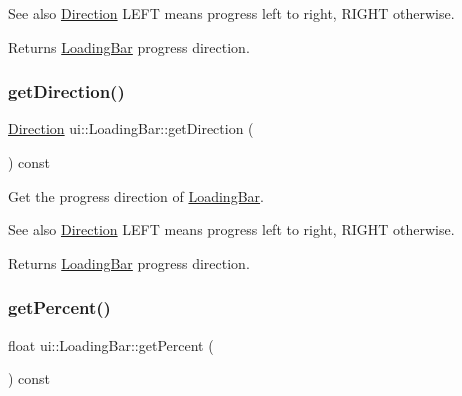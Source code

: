 \begin{DoxySeeAlso}{See also}
\hyperlink{classui_1_1LoadingBar_a4407b3ce72891a78755e25d765e25063}{Direction} {\ttfamily L\+E\+FT} means progress left to right, {\ttfamily R\+I\+G\+HT} otherwise. 
\end{DoxySeeAlso}
\begin{DoxyReturn}{Returns}
\hyperlink{classui_1_1LoadingBar}{Loading\+Bar} progress direction. 
\end{DoxyReturn}
\mbox{\label{classui_1_1LoadingBar_a18a37f835549480ff0cf0ce2fde8b8dc}} 
\subsubsection{\texorpdfstring{get\+Direction()}{getDirection()}\hspace{0.1cm}{\footnotesize\ttfamily [2/2]}}
{\footnotesize\ttfamily \hyperlink{classui_1_1LoadingBar_a4407b3ce72891a78755e25d765e25063}{Direction} ui\+::\+Loading\+Bar\+::get\+Direction (\begin{DoxyParamCaption}{ }\end{DoxyParamCaption}) const}

Get the progress direction of \hyperlink{classui_1_1LoadingBar}{Loading\+Bar}.

\begin{DoxySeeAlso}{See also}
\hyperlink{classui_1_1LoadingBar_a4407b3ce72891a78755e25d765e25063}{Direction} {\ttfamily L\+E\+FT} means progress left to right, {\ttfamily R\+I\+G\+HT} otherwise. 
\end{DoxySeeAlso}
\begin{DoxyReturn}{Returns}
\hyperlink{classui_1_1LoadingBar}{Loading\+Bar} progress direction. 
\end{DoxyReturn}
\mbox{\label{classui_1_1LoadingBar_a8a0ce53c7f26ef008cd31873eea7889b}} 
\subsubsection{\texorpdfstring{get\+Percent()}{getPercent()}\hspace{0.1cm}{\footnotesize\ttfamily [1/2]}}
{\footnotesize\ttfamily float ui\+::\+Loading\+Bar\+::get\+Percent (\begin{DoxyParamCaption}{ }\end{DoxyParamCaption}) const}


